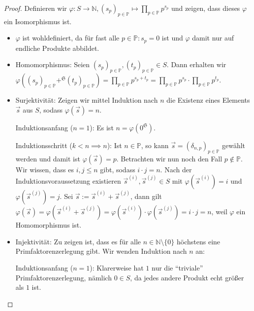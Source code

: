 \begin{proof} Definieren wir $\varphi: S \to \mathbb{N}, (s_p)_{p \in \mathbb{P}} \mapsto \prod_{p \in \mathbb{P}} p^{s_p}$ und zeigen, dass dieses $\varphi$ ein Isomorphismus ist.
    \begin{itemize}[topsep=0cm, label={--}]
        \item $\varphi$ ist wohldefiniert, da für fast alle $p \in \mathbb{P}: s_p = 0$ ist und $\varphi$ damit nur auf endliche Produkte abbildet.
        
        \item Homomorphismus: Seien $(s_p)_{p \in \mathbb{P}}, (t_p)_{p \in \mathbb{P}} \in S$. Dann erhalten wir $\varphi((s_p)_{p \in \mathbb{P}} +^\mathfrak{S} (t_p)_{p \in \mathbb{P}}) = \prod_{p \in \mathbb{P}} p^{s_p + t_p} = \prod_{p \in \mathbb{P}} p^{s_p} \cdot \prod_{p \in \mathbb{P}} p^{t_p}$.
        
        \item Surjektivität: Zeigen wir mittel Induktion nach $n$ die Existenz eines Elements $\vec{s}$ aus $S$, sodass $\varphi(\vec{s}) = n$.
        
        Induktionsanfang ($n=1$): Es ist $n = \varphi(0^\mathfrak{S})$.

        Induktionsschritt ($k<n \implies n$): Ist $n \in \mathbb{P}$, so kann $\vec{s} = (\delta_{n,p})_{p \in \mathbb{P}}$ gewählt werden und damit ist $\varphi(\vec{s}) = p$. Betrachten wir nun noch den Fall $p \not\in \mathbb{P}$. Wir wissen, dass es $i, j \le n$ gibt, sodass $i \cdot j = n$. Nach der Induktionsvoraussetzung existieren $\vec s^{(i)}, \vec s^{(j)} \in S$ mit $\varphi(\vec s^{(i)}) = i$ und $\varphi(\vec s^{(j)}) = j$. Sei $\vec s := \vec s^{(i)} + \vec s^{(j)}$, dann gilt $\varphi(\vec s) = \varphi(\vec s^{(i)} + \vec s^{(j)}) = \varphi(\vec s^{(i)}) \cdot \varphi(\vec s^{(j)}) = i \cdot j = n$, weil $\varphi$ ein Homomorphismus ist.

        \item Injektivität: Zu zeigen ist, dass es für alle $n \in \mathbb{N} \setminus \{0\}$ höchstens eine Primfaktorenzerlegung gibt. Wir wenden Induktion nach $n$ an:
        
        Induktionsanfang ($n=1$): Klarerweise hat $1$ nur die ``triviale'' Primfaktorenzerlegung, nämlich $0 \in S$, da jedes andere Produkt echt größer als $1$ ist.


\end{itemize}
\end{proof}

